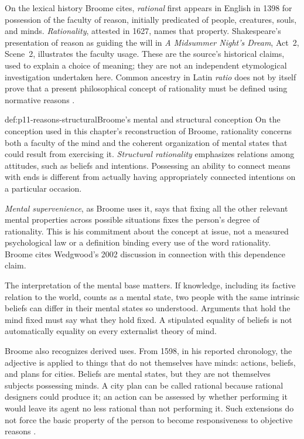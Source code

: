 On the lexical history Broome cites, \emph{rational} first appears in English
in 1398 for possession of the faculty of reason, initially predicated of
people, creatures, souls, and minds. \emph{Rationality}, attested in 1627,
names that property. Shakespeare's presentation of reason as guiding the will
in \emph{A Midsummer Night's Dream}, Act~2, Scene~2, illustrates the faculty
usage. These are the source's historical claims,
used to explain a choice of meaning; they are not an independent etymological
investigation undertaken here. Common ancestry in Latin \emph{ratio} does not
by itself prove that a present philosophical concept of rationality must be
defined using normative reasons
\parencite[pp.~130--131]{Broome2021ReasonsRationality}.

\begin{hbdefinition}{def:p11-reasons-structural}{Broome's mental and structural conception}
On the conception used in this chapter's reconstruction of Broome, rationality
concerns both a faculty of the mind and the coherent organization of mental
states that could result from exercising it. \emph{Structural rationality}
emphasizes relations among attitudes, such as beliefs and intentions.
Possessing an ability to connect means with ends is different from actually
having appropriately connected intentions on a particular occasion.

\emph{Mental supervenience}, as Broome uses it, says that fixing all the other
relevant mental properties across possible situations fixes the person's
degree of rationality. This is his commitment about the concept at issue,
not a measured psychological law or a definition binding every use of the
word rationality. Broome cites Wedgwood's 2002 discussion in connection with
this dependence claim.
\end{hbdefinition}

The interpretation of the mental base matters. If knowledge, including its
factive relation to the world, counts as a mental state, two people with the
same intrinsic beliefs can differ in their mental states so understood.
Arguments that hold the mind fixed must say what they hold fixed. A stipulated
equality of beliefs is not automatically equality on every externalist theory
of mind.

Broome also recognizes derived uses. From 1598, in his reported chronology, the
adjective is applied to things that do not themselves have minds: actions,
beliefs, and plans for cities. Beliefs are mental states, but they are not
themselves subjects possessing minds. A city plan can be called rational
because rational designers could produce it; an action can be assessed by
whether performing it would leave its agent no less rational than not
performing it. Such extensions do not force the basic property of the
person to become responsiveness to objective reasons
\parencite[pp.~130--131]{Broome2021ReasonsRationality}.

